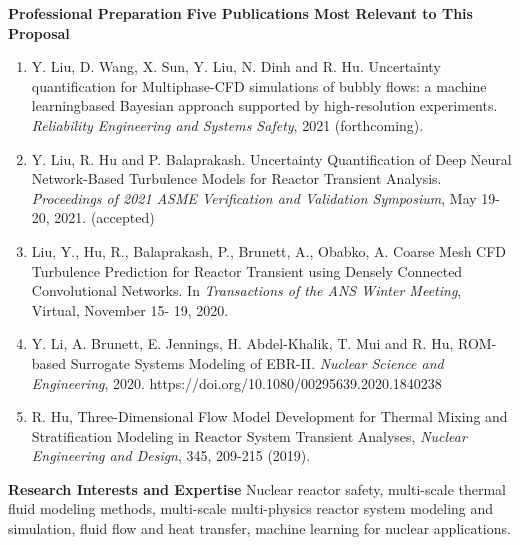 \documentclass[11pt,letterpaper,english]{article}
\begin{document}
\begin{flushleft} {\bf Professional Preparation}
\vspace{.04in}
{\bf Five Publications Most Relevant to This Proposal}
\vspace{-6pt}
\begin{enumerate} \itemsep1pt \parskip0pt 
\item Y. Liu, D. Wang, X. Sun, Y. Liu, N. Dinh and R. Hu. Uncertainty quantification for Multiphase-CFD simulations of bubbly flows: a machine learningbased Bayesian approach supported by high-resolution experiments. \textit{Reliability Engineering and Systems Safety}, 2021 (forthcoming).\\
\item Y. Liu, R. Hu and P. Balaprakash. Uncertainty Quantification of Deep Neural Network-Based Turbulence Models for Reactor Transient Analysis. \textit{Proceedings of 2021 ASME Verification and Validation Symposium}, May 19-20, 2021. (accepted) \\
\item Liu, Y., Hu, R., Balaprakash, P., Brunett, A., Obabko, A. Coarse Mesh CFD Turbulence Prediction for Reactor Transient using Densely Connected Convolutional Networks. In \textit{Transactions of the ANS Winter Meeting}, Virtual, November 15- 19, 2020.\\
\item Y. Li, A. Brunett, E. Jennings, H. Abdel-Khalik, T. Mui and R. Hu, ROM-based Surrogate Systems Modeling of EBR-II. \textit{Nuclear Science and Engineering}, 2020. https://doi.org/10.1080/00295639.2020.1840238\\
\item R. Hu, Three-Dimensional Flow Model Development for Thermal Mixing and Stratification Modeling in Reactor System Transient Analyses, \textit{Nuclear Engineering and Design}, 345, 209-215 (2019).
\end{enumerate}

\vspace{-6pt}
{\bf Research Interests and Expertise}
{\parindent 16pt
Nuclear reactor safety, multi-scale thermal fluid modeling methods, multi-scale multi-physics reactor system modeling and simulation, fluid flow and heat transfer, machine learning for nuclear applications.
}


\end{flushleft}
\end{document}
